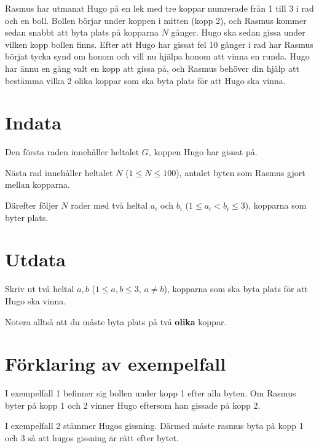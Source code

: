 
Rasmus har utmanat Hugo på en lek med tre koppar numrerade från 1 till 3 i rad och en boll. Bollen börjar under koppen i
mitten (kopp 2), och Rasmus kommer sedan snabbt att byta plats på kopparna $N$ gånger.
Hugo ska sedan gissa under vilken kopp bollen finns. Efter att Hugo har gissat fel 10 gånger i rad
har Rasmus börjat tycka synd om honom och vill nu hjälpa honom att vinna en runda.
Hugo har ännu en gång valt en kopp att gissa på, och Rasmus behöver din hjälp att bestämma vilka
2 olika koppar som ska byta plats för att Hugo ska vinna.

\section*{Indata}
Den första raden innehåller heltalet $G$, koppen Hugo har gissat på.

Nästa rad innehåller heltalet $N$ ($1 \le N \le 100$), antalet byten som Rasmus gjort mellan kopparna.

Därefter följer $N$ rader med två heltal $a_i$ och $b_i$ ($1 \le a_i < b_i \le 3$), kopparna som byter plats.

\section*{Utdata}
Skriv ut två heltal $a,b$ ($1 \leq a,b \leq 3$, $a \neq b$), kopparna som ska byta plats för att Hugo ska vinna.

Notera alltså att du måste byta plats på två \textbf{olika} koppar.

\section*{Förklaring av exempelfall}
I exempelfall 1 befinner sig bollen under kopp 1 efter alla byten. Om Rasmus byter på kopp 1 och 2 vinner
Hugo eftersom han gissade på kopp 2.

I exempelfall 2 stämmer Hugos gissning. Därmed måste rasmus byta på kopp 1 och 3 så att hugos gissning
är rätt efter bytet.

